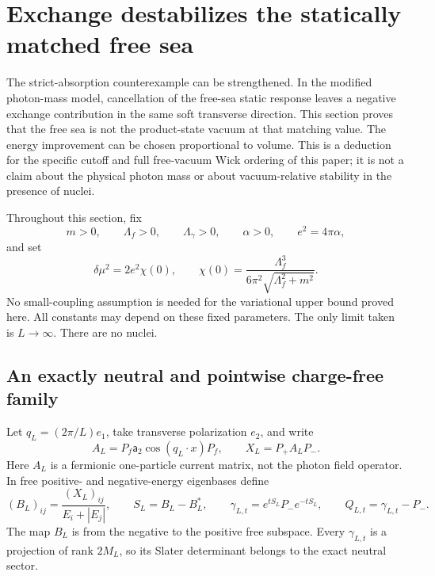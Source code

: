 \section{Exchange destabilizes the statically matched free sea}
\label{pv-section}

The strict-absorption counterexample can be strengthened. In the modified
photon-mass model, cancellation of the free-sea static response leaves a
negative exchange contribution in the same soft transverse direction.
This section proves that the free sea is not the product-state vacuum at
that matching value. The energy improvement can be chosen proportional to
volume. This is a deduction for the specific cutoff and full free-vacuum
Wick ordering of this paper; it is not a claim about the physical photon
mass or about vacuum-relative stability in the presence of nuclei.

Throughout this section, fix
\[
 m>0,\qquad \Lambda_f>0,\qquad \Lambda_\gamma>0,\qquad
 \alpha>0,\qquad e^2=4\pi\alpha,
\]
and set
\begin{equation}
 \delta\mu^2=2e^2\chi(0),\qquad
 \chi(0)=\frac{\Lambda_f^3}{6\pi^2\sqrt{\Lambda_f^2+m^2}}.
 \label{pv-matching}
\end{equation}
No small-coupling assumption is needed for the variational upper bound
proved here. All constants may depend on these fixed parameters.
The only limit taken is \(L\to\infty\). There are no nuclei.

\subsection{An exactly neutral and pointwise charge-free family}

Let \(q_L=(2\pi/L)e_1\), take transverse polarization \(e_2\), and write
\[
 A_L=P_f\mathsf a_2\cos(q_L\cdot x)P_f,
 \qquad X_L=P_+A_LP_-.
\]
Here \(A_L\) is a fermionic one-particle current matrix, not the photon
field operator. In free positive- and negative-energy eigenbases define
\begin{equation}
 (B_L)_{ij}=\frac{(X_L)_{ij}}{E_i+|E_j|},\qquad
 S_L=B_L-B_L^*,\qquad
 \gamma_{L,t}=e^{tS_L}P_-e^{-tS_L},\qquad
 Q_{L,t}=\gamma_{L,t}-P_-.
 \label{pv-family}
\end{equation}
The map \(B_L\) is from the negative to the positive free subspace.
Every \(\gamma_{L,t}\) is a projection of rank \(2M_L\), so its Slater
determinant belongs to the exact neutral sector.

